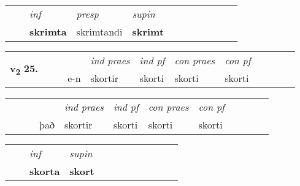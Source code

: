\begin{tabular}{llllllllllll}
 & & \textit{inf}     & \textit{presp} & \textit{supin}       \\*
  & & \textbf{skrimta}      & skrimtandi &  \textbf{skrimt}   \\*
\cmidrule{1-12}
\end{tabular}





\begin{tabular}{llllllllllll}\toprule
\multirow{4}{*}{{{\textbf{v{\textsubscript{2}}} \Large{\textbf{25.}}}}}  & &  & &  \textit{ind praes} & \textit{ind pf} & \textit{con praes} & \textit{con pf} \\*
&  & & e-n & skortir & skorti & skorti & skorti \\*
\cmidrule{5-9}
\end{tabular}


\begin{tabular}{llllllllllll}
 & &  & &  \textit{ind praes} & \textit{ind pf} & \textit{con praes} & \textit{con pf} \\*
&  & & það & skortir & skorti & skorti & skorti \\*
\cmidrule{5-9}
\end{tabular}


\begin{tabular}{llllllllllll}
 & & \textit{inf}      & \textit{supin}       \\*
  & & \textbf{skorta}       &  \textbf{skort}   \\*
\cmidrule{1-12}
\end{tabular}



